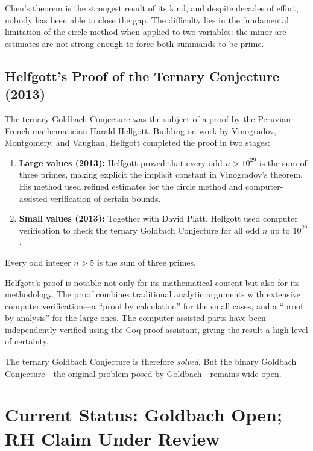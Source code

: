 Chen's theorem is the strongest result of its kind, and despite decades of effort, nobody has been able to close the gap. The difficulty lies in the fundamental limitation of the circle method when applied to two variables: the minor arc estimates are not strong enough to force both summands to be prime.

\subsection{Helfgott's Proof of the Ternary Conjecture (2013)}

The ternary Goldbach Conjecture was the subject of a proof by the Peruvian--French mathematician Harald Helfgott. Building on work by Vinogradov, Montgomery, and Vaughan, Helfgott completed the proof in two stages:

\begin{enumerate}
    \item \textbf{Large values (2013):} Helfgott proved that every odd $n > 10^{29}$ is the sum of three primes, making explicit the implicit constant in Vinogradov's theorem. His method used refined estimates for the circle method and computer-assisted verification of certain bounds.
    \item \textbf{Small values (2013):} Together with David Platt, Helfgott used computer verification to check the ternary Goldbach Conjecture for all odd $n$ up to $10^{29}$.
\end{enumerate}

\begin{theorem}[Helfgott, 2013]\label{thm:helfgott}
Every odd integer $n > 5$ is the sum of three primes.
\end{theorem}

Helfgott's proof is notable not only for its mathematical content but also for its methodology. The proof combines traditional analytic arguments with extensive computer verification---a ``proof by calculation'' for the small cases, and a ``proof by analysis'' for the large ones. The computer-assisted parts have been independently verified using the Coq proof assistant, giving the result a high level of certainty.

The ternary Goldbach Conjecture is therefore \emph{solved}. But the binary Goldbach Conjecture---the original problem posed by Goldbach---remains wide open.

\section{Current Status: Goldbach Open; RH Claim Under Review}

